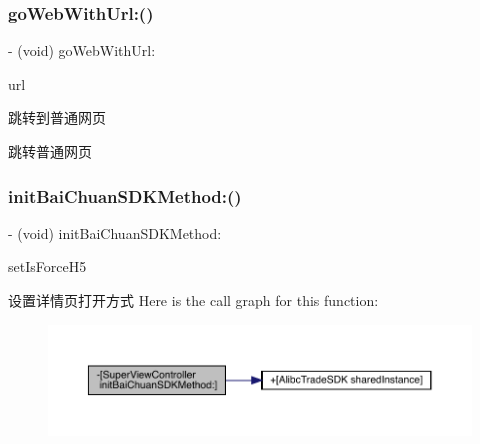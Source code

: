 \subsubsection{\texorpdfstring{go\+Web\+With\+Url\+:()}{goWebWithUrl:()}}
{\footnotesize\ttfamily -\/ (void) go\+Web\+With\+Url\+: \begin{DoxyParamCaption}\item[{(N\+S\+String $\ast$)}]{url }\end{DoxyParamCaption}}

跳转到普通网页

跳转普通网页 \mbox{\label{interface_super_view_controller_aa12abbb1b1182a2b878e2faaffb3b5a4}} 
\subsubsection{\texorpdfstring{init\+Bai\+Chuan\+S\+D\+K\+Method\+:()}{initBaiChuanSDKMethod:()}}
{\footnotesize\ttfamily -\/ (void) init\+Bai\+Chuan\+S\+D\+K\+Method\+: \begin{DoxyParamCaption}\item[{(B\+O\+OL)}]{set\+Is\+Force\+H5 }\end{DoxyParamCaption}}

设置详情页打开方式 Here is the call graph for this function\+:\nopagebreak
\begin{figure}[H]
\begin{center}
\leavevmode
\includegraphics[width=350pt]{interface_super_view_controller_aa12abbb1b1182a2b878e2faaffb3b5a4_cgraph}
\end{center}
\end{figure}
\mbox{\label{interface_super_view_controller_a63c776a89d192c745618d2e9a5eca8dd}} 
